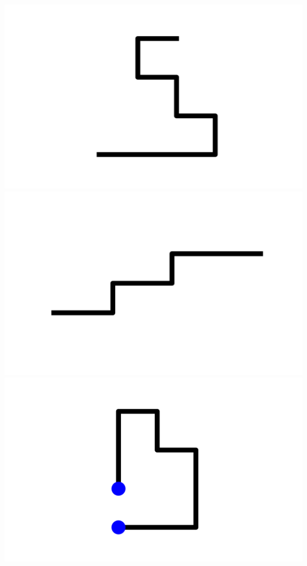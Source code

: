 \documentclass[]{report}
\begin{document}
\includegraphics[scale=.1]{pictures/21/state_cluster_shapes_112.pdf} 
\includegraphics[scale=.1]{pictures/21/state_cluster_shapes_113.pdf} 
\includegraphics[scale=.1]{pictures/21/state_cluster_shapes_114.pdf} 
\end{document}
